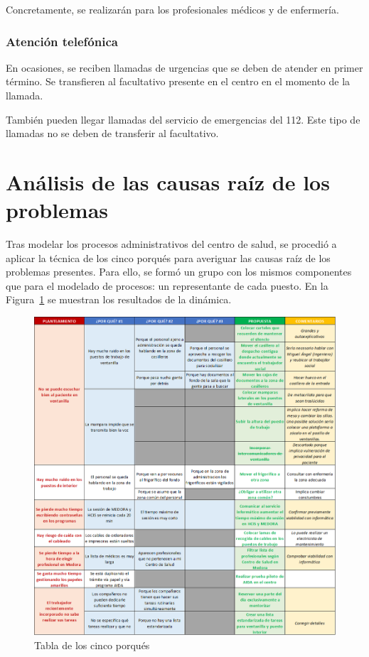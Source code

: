 Concretamente, se realizarán para los profesionales médicos y de enfermería.

\subsubsection{Atención telefónica}

En ocasiones, se reciben llamadas de urgencias que se deben de atender en primer término. Se transfieren al facultativo presente en el centro en el momento de la llamada.

También pueden llegar llamadas del servicio de emergencias del 112. Este tipo de llamadas no se deben de transferir al facultativo.

\section{Análisis de las causas raíz de los problemas}

Tras modelar los procesos administrativos del centro de salud, se procedió a aplicar la técnica de los cinco porqués para averiguar las causas raíz de los problemas presentes.
Para ello, se formó un grupo con los mismos componentes que para el modelado de procesos: un representante de cada puesto. En la Figura~\ref{fig:cinco-porques} se muestran los resultados de la dinámica.

\begin{figure}
    \includegraphics[width=\textwidth]{img/cinco-porques.png}
    \caption{Tabla de los cinco porqués}
    \label{fig:cinco-porques}
\end{figure}

